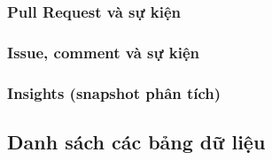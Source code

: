 \subsubsection{Pull Request và sự kiện}


\subsubsection{Issue, comment và sự kiện}


\subsubsection{Insights (snapshot phân tích)}


\subsection{Danh sách các bảng dữ liệu}
\renewcommand{\arraystretch}{1.2}
